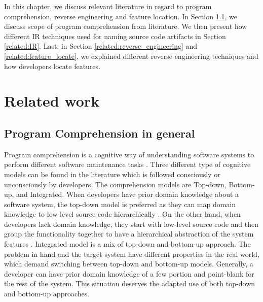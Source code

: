 In this chapter, we discuss relevant literature in regard to program comprehension, reverse engineering and feature location. In Section \ref{related:program_comprehension}, we discuss scope of program comprehension from literature. We then present how different IR techniques used for naming source code artifacts in Section \ref{related:IR}. Last, in Section \ref{related:reverse_engineering} and \ref{related:feature_locate}, we explained different reverse engineering techniques and how developers locate features.

\section{Related work}
\subsection{Program Comprehension in general}
\label{related:program_comprehension}
Program comprehension is a cognitive way of understanding software systems to perform different software maintenance tasks \cite{wei2002surveyCategorizationComprehension, siegmund2016programPastFuture}. Three different type of cognitive models \cite{tilley1998reverseEngineeringFramework, von1993programToolRequirements, siegmund2016programPastFuture} can be found in the literature which is followed consciously or unconsciously by developers. The comprehension models are Top-down, Bottom-up, and Integrated. When developers have prior domain knowledge about a software system, the top-down model is preferred as they can map domain knowledge to low-level source code hierarchically \cite{brooks1983theoryComprehensionPrograms}. On the other hand, when developers lack domain knowledge, they start with low-level source code and then group the functionality together to have a hierarchical abstraction of the system features \cite{shneiderman1979syntacticInteractionsModel, pennington1987stimulusMentalRepresentations}. Integrated model \cite{shaft1995relevanceDomainKnowledge, von1993programToolRequirements} is a mix of top-down and bottom-up approach. The problem in hand and the target system have different properties in the real world, which demand switching between top-down and bottom-up models. Generally, a developer can have prior domain knowledge of a few portion and point-blank for the rest of the system. This situation deserves the adapted use of both top-down and bottom-up approaches.   


